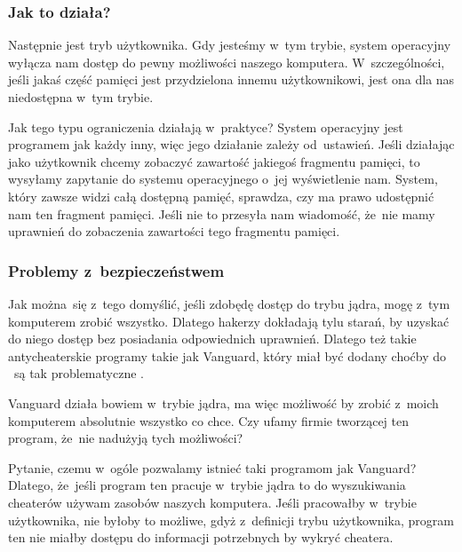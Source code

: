 \documentclass[10pt,t]{beamer}
\begin{document}
\begin{frame}
  \frametitle{Jak to działa?}


  Następnie jest tryb użytkownika. Gdy jesteśmy w~tym trybie, system
  operacyjny wyłącza nam dostęp do pewny możliwości naszego komputera.
  W~szczególności, jeśli jakaś część pamięci jest przydzielona innemu
  użytkownikowi, jest ona dla nas niedostępna w~tym trybie.

  Jak tego typu ograniczenia działają w~praktyce? System operacyjny jest
  programem jak każdy inny, więc jego działanie zależy od~ustawień. Jeśli
  działając jako użytkownik chcemy zobaczyć zawartość jakiegoś fragmentu
  pamięci, to wysyłamy zapytanie do systemu operacyjnego o~jej wyświetlenie
  nam. System, który zawsze widzi całą dostępną pamięć, sprawdza, czy ma
  prawo udostępnić nam ten fragment pamięci. Jeśli nie to przesyła nam
  wiadomość, że~nie mamy uprawnień do zobaczenia zawartości tego fragmentu
  pamięci.

\end{frame}





\begin{frame}
  \frametitle{Problemy z~bezpieczeństwem}


  Jak można~się z~tego domyślić, jeśli zdobędę dostęp do trybu jądra, mogę
  z~tym komputerem zrobić wszystko. Dlatego hakerzy dokładają tylu starań,
  by uzyskać do niego dostęp \alert{bez} posiadania odpowiednich uprawnień.
  Dlatego też takie antycheaterskie programy takie jak Vanguard, który miał
  być dodany choćby do
  ~są tak problematyczne
  \parencite{Low-Level-Why-Riots-anti-cheat-is-a-HUGE-problem-Ver-2024}.

  Vanguard działa bowiem w~trybie jądra, ma więc możliwość by zrobić
  z~moich komputerem absolutnie wszystko co chce. Czy ufamy firmie
  tworzącej ten program, że~nie nadużyją tych możliwości?

  Pytanie, czemu w~ogóle pozwalamy istnieć taki programom jak Vanguard?
  Dlatego, że~jeśli program ten pracuje w~trybie jądra to do wyszukiwania
  cheaterów używam zasobów \alert{naszych} komputera. Jeśli pracowałby
  w~trybie użytkownika, nie byłoby to możliwe, gdyż z~definicji trybu
  użytkownika, program ten nie miałby dostępu do informacji potrzebnych by
  wykryć cheatera.

\end{frame}
\end{document}

